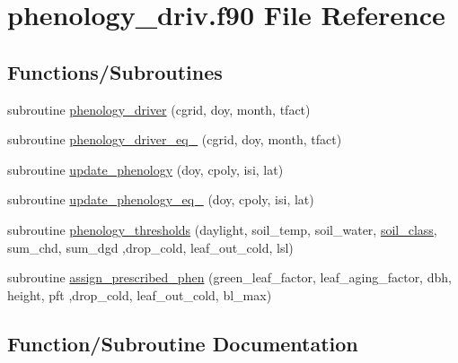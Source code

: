 \hypertarget{phenology__driv_8f90}{}\section{phenology\+\_\+driv.\+f90 File Reference}
\label{phenology__driv_8f90}
\subsection*{Functions/\+Subroutines}
\begin{DoxyCompactItemize}
\item 
subroutine \hyperlink{phenology__driv_8f90_aebe550e627508a275e8a1000e3bc9c13}{phenology\+\_\+driver} (cgrid, doy, month, tfact)
\item 
subroutine \hyperlink{phenology__driv_8f90_ab9a0459d8cb63117c39488527da2a451}{phenology\+\_\+driver\+\_\+eq\+\_} (cgrid, doy, month, tfact)
\item 
subroutine \hyperlink{phenology__driv_8f90_a133c291d6ae8cda0fb270023203ff229}{update\+\_\+phenology} (doy, cpoly, isi, lat)
\item 
subroutine \hyperlink{phenology__driv_8f90_aad3dbb3ae553616293acf71ccc09158a}{update\+\_\+phenology\+\_\+eq\+\_} (doy, cpoly, isi, lat)
\item 
subroutine \hyperlink{phenology__driv_8f90_aa404fdf30b88343b2c85cd24c096a06e}{phenology\+\_\+thresholds} (daylight, soil\+\_\+temp, soil\+\_\+water, \hyperlink{structsoil__coms_1_1soil__class}{soil\+\_\+class}, sum\+\_\+chd, sum\+\_\+dgd                                                                                                                               ,drop\+\_\+cold, leaf\+\_\+out\+\_\+cold, lsl)
\item 
subroutine \hyperlink{phenology__driv_8f90_aabac28b5c2ec4bdad019f3e1b716033e}{assign\+\_\+prescribed\+\_\+phen} (green\+\_\+leaf\+\_\+factor, leaf\+\_\+aging\+\_\+factor, dbh, height, pft                                                                                                                                                       ,drop\+\_\+cold, leaf\+\_\+out\+\_\+cold, bl\+\_\+max)
\end{DoxyCompactItemize}


\subsection{Function/\+Subroutine Documentation}
